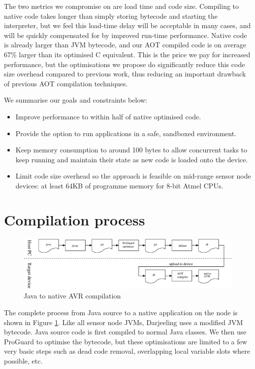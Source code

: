 The two metrics we compromise on are load time and code size. Compiling to native code takes longer than simply storing bytecode and starting the interpreter, but we feel this load-time delay will be acceptable in many cases, and will be quickly compensated for by improved run-time performance. Native code is already larger than JVM bytecode, and our AOT compiled code is on average 67\% larger than its optimised C equivalent. This is the price we pay for increased performance, but the optimisations we propose do significantly reduce this code size overhead compared to previous work, thus reducing an important drawback of previous AOT compilation techniques.

We summarise our goals and constraints below:
\begin{itemize}
  \item Improve performance to within half of native optimised code.
  \item Provide the option to run applications in a safe, sandboxed environment.
  \item Keep memory consumption to around 100 bytes to allow concurrent tasks to keep running and maintain their state as new code is loaded onto the device.
  \item Limit code size overhead so the approach is feasible on mid-range sensor node devices: at least 64KB of programme memory for 8-bit Atmel CPUs.
\end{itemize}

\section{Compilation process}
\label{sec-compilation-process}

\begin{figure}
\includegraphics[width=\linewidth]{compilation-process.eps}
\caption{Java to native AVR compilation}
\label{fig-translation-process}
\end{figure}

The complete process from Java source to a native application on the node is shown in Figure \ref{fig-translation-process}. Like all sensor node JVMs, Darjeeling uses a modified JVM bytecode. Java source code is first compiled to normal Java classes. We then use ProGuard \cite{proguard} to optimise the bytecode, but these optimisations are limited to a few very basic steps such as dead code removal, overlapping local variable slots where possible, etc.

